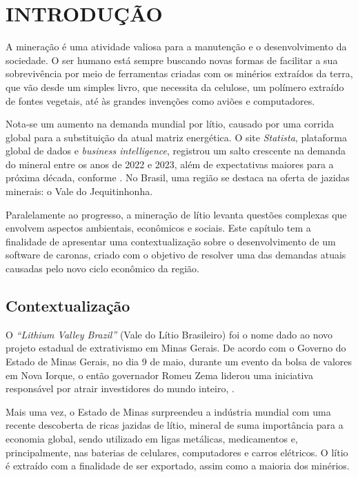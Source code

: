 \chapter{INTRODUÇÃO}

A mineração é uma atividade valiosa para a manutenção e o desenvolvimento da sociedade. O ser humano está sempre buscando novas formas de facilitar a sua sobrevivência por meio de ferramentas criadas com os minérios extraídos da terra, que vão desde um simples livro, que necessita da celulose, um polímero extraído de fontes vegetais, até às grandes invenções como aviões e computadores.

Nota-se um aumento na demanda mundial por lítio, causado por uma corrida global para a substituição da atual matriz energética. O site \textit{Statista}, plataforma global de dados e \textit{business intelligence}, registrou um salto crescente na demanda do mineral entre os anos de 2022 e 2023, além de expectativas maiores para a próxima década, conforme . No Brasil, uma região se destaca na oferta de jazidas minerais: o Vale do Jequitinhonha.

Paralelamente ao progresso, a mineração de lítio levanta questões complexas que envolvem aspectos ambientais, econômicos e sociais. Este capítulo tem a finalidade de apresentar uma contextualização sobre o desenvolvimento de um software de caronas, criado com o objetivo de resolver uma das demandas atuais causadas pelo novo ciclo econômico da região.


\section{Contextualização}

O \textit{“Lithium Valley Brazil”} (Vale do Lítio Brasileiro) foi o nome dado ao novo projeto estadual de extrativismo em Minas Gerais. De acordo com o Governo do Estado de Minas Gerais, no dia 9 de maio, durante um evento da bolsa de valores em Nova Iorque, o então governador Romeu Zema liderou uma iniciativa responsável por atrair investidores do mundo inteiro, .

Mais uma vez, o Estado de Minas surpreendeu a indústria mundial com uma recente descoberta de ricas jazidas de lítio, mineral de suma importância para a economia global, sendo utilizado em ligas metálicas, medicamentos e, principalmente, nas baterias de celulares, computadores e carros elétricos. O lítio é extraído com a finalidade de ser exportado, assim como a maioria dos minérios.

